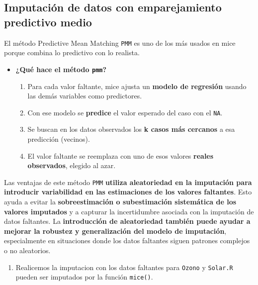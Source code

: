 \documentclass[
]{book}
\providecommand{\tightlist}{%
  \setlength{\itemsep}{0pt}\setlength{\parskip}{0pt}}
\begin{document}
\subsection{Imputación de datos con emparejamiento predictivo medio}\label{imputaciuxf3n-de-datos-con-emparejamiento-predictivo-medio}

El método Predictive Mean Matching \texttt{PMM} es uno de los más usados en mice porque combina lo predictivo con lo realista.

\begin{itemize}
\tightlist
\item
  \textbf{¿Qué hace el método \texttt{pmm}?}

  \begin{enumerate}
  \def\labelenumi{\arabic{enumi}.}
  \tightlist
  \item
    Para cada valor faltante, mice ajusta un \textbf{modelo de regresión} usando las demás variables como predictores.
  \item
    Con ese modelo se \textbf{predice} el valor esperado del caso con el \texttt{NA}.
  \item
    Se buscan en los datos observados los \textbf{k casos más cercanos} a esa predicción (vecinos).
  \item
    El valor faltante se reemplaza con uno de esos valores \textbf{reales observados}, elegido al azar.
  \end{enumerate}
\end{itemize}

Las ventajas de este método \texttt{PMM} \textbf{utiliza aleatoriedad en la imputación para introducir variabilidad en las estimaciones de los valores faltantes}. Esto ayuda a evitar la \textbf{sobreestimación o subestimación sistemática de los valores imputados} y a capturar la incertidumbre asociada con la imputación de datos faltantes. La \textbf{introducción de aleatoriedad también puede ayudar a mejorar la robustez y generalización del modelo de imputación}, especialmente en situaciones donde los datos faltantes siguen patrones complejos o no aleatorios.

\begin{enumerate}
\def\labelenumi{\arabic{enumi}.}
\tightlist
\item
  Realicemos la imputacion con los datos faltantes para \texttt{Ozono} y \texttt{Solar.R} pueden ser imputados por la función \texttt{mice()}.
\end{enumerate}
\end{document}
